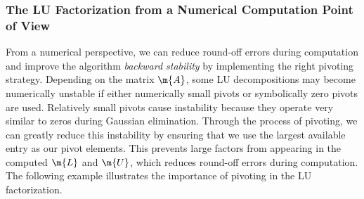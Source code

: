 \subsubsection{The LU Factorization from a Numerical Computation Point of View}

From a numerical perspective, we can reduce round-off errors during computation and improve the algorithm \emph{backward stability} by implementing the right pivoting strategy. Depending on the matrix $\m{A}$, some \ac{LU} decompositions may become numerically unstable if either numerically small pivots or symbolically zero pivots are used. Relatively small pivots cause instability because they operate very similar to zeros during Gaussian elimination. Through the process of pivoting, we can greatly reduce this instability by ensuring that we use the largest available entry as our pivot elements. This prevents large factors from appearing in the computed $\m{L}$ and $\m{U}$, which reduces round-off errors during computation. The following example illustrates the importance of pivoting in the \ac{LU} factorization.

